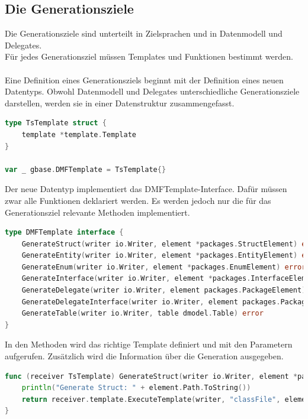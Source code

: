 \documentclass[./einleitung.tex]{subfiles}
\begin{document}
    \subsection{Die Generationsziele}\label{subsec:die-generationsziele}
    Die Generationsziele sind unterteilt in Zielsprachen und in Datenmodell und Delegates.\\
    Für jedes Generationsziel müssen Templates und Funktionen bestimmt werden.
    \\\\
    Eine Definition eines Generationsziels beginnt mit der Definition eines neuen Datentyps.
    Obwohl Datenmodell und Delegates unterschiedliche Generationsziele darstellen, werden sie in einer Datenstruktur zusammengefasst.
    \begin{lstlisting}[language=Go, cation=Definition des Typescript Generationsziel, label=lst:TsTemplate]
type TsTemplate struct {
	template *template.Template
}

var _ gbase.DMFTemplate = TsTemplate{}
    \end{lstlisting}
    Der neue Datentyp implementiert das DMFTemplate-Interface.
    Dafür müssen zwar alle Funktionen deklariert werden.
    Es werden jedoch nur die für das Generationsziel relevante Methoden implementiert.
    \begin{lstlisting}[language=Go, caption=Definition des DMFTemplate-Interfaces, label=lst:DMFTemplate]
type DMFTemplate interface {
	GenerateStruct(writer io.Writer, element *packages.StructElement) error
	GenerateEntity(writer io.Writer, element *packages.EntityElement) error
	GenerateEnum(writer io.Writer, element *packages.EnumElement) error
	GenerateInterface(writer io.Writer, element *packages.InterfaceElement) error
	GenerateDelegate(writer io.Writer, element packages.PackageElement) error
	GenerateDelegateInterface(writer io.Writer, element packages.PackageElement) error
	GenerateTable(writer io.Writer, table dmodel.Table) error
}
    \end{lstlisting}
    In den Methoden wird das richtige Template definiert und mit den Parametern aufgerufen.
    Zusätzlich wird die Information über die Generation ausgegeben.
    \begin{lstlisting}[language=Go, caption=Aufruf der Generation einer Typescript Klasse, label=lst:genTsClass]
func (receiver TsTemplate) GenerateStruct(writer io.Writer, element *packages.StructElement) error {
	println("Generate Struct: " + element.Path.ToString())
	return receiver.template.ExecuteTemplate(writer, "classFile", element)
}
    \end{lstlisting}
\end{document}
